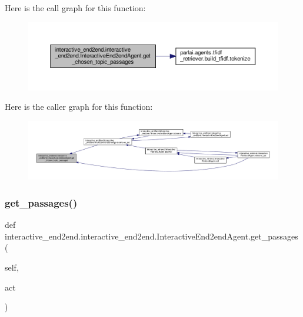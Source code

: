 Here is the call graph for this function\+:
\nopagebreak
\begin{figure}[H]
\begin{center}
\leavevmode
\includegraphics[width=350pt]{classinteractive__end2end_1_1interactive__end2end_1_1InteractiveEnd2endAgent_ad8ef18518675b9aa72280547b56d3a1e_cgraph}
\end{center}
\end{figure}
Here is the caller graph for this function\+:
\nopagebreak
\begin{figure}[H]
\begin{center}
\leavevmode
\includegraphics[width=350pt]{classinteractive__end2end_1_1interactive__end2end_1_1InteractiveEnd2endAgent_ad8ef18518675b9aa72280547b56d3a1e_icgraph}
\end{center}
\end{figure}
\mbox{\label{classinteractive__end2end_1_1interactive__end2end_1_1InteractiveEnd2endAgent_a47de7bd0acb24fb9d76d6d1555253e9f}} 
\subsubsection{\texorpdfstring{get\+\_\+passages()}{get\_passages()}}
{\footnotesize\ttfamily def interactive\+\_\+end2end.\+interactive\+\_\+end2end.\+Interactive\+End2end\+Agent.\+get\+\_\+passages (\begin{DoxyParamCaption}\item[{}]{self,  }\item[{}]{act }\end{DoxyParamCaption})}

